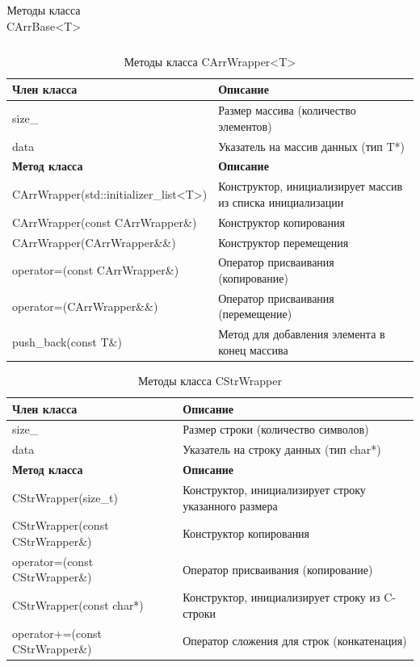 \documentclass[14pt,a4paper]{article}
\begin{document}
{\begin{table}[H]
\begin{tabular}{|l|l|}
  \end{tabular}
  \caption{Методы класса CArrBase<T>}
\end{table}
\begin{table}[H]
  \centering
  \begin{tabular}{|l|l|} \hline
    \textbf{Член класса} & \textbf{Описание} \\ \hline
    size\_ & Размер массива (количество элементов) \\ \hline
    data & Указатель на массив данных (тип T*) \\ \hline
    \textbf{Метод класса} & \textbf{Описание} \\ \hline
    CArrWrapper(std::initializer\_list<T>) & Конструктор, инициализирует массив из списка инициализации \\ \hline
    CArrWrapper(const CArrWrapper\&) & Конструктор копирования \\ \hline
    CArrWrapper(CArrWrapper\&\&) & Конструктор перемещения \\ \hline
    operator=(const CArrWrapper\&) & Оператор присваивания (копирование) \\ \hline
    operator=(CArrWrapper\&\&) & Оператор присваивания (перемещение) \\ \hline
    push\_back(const T\&) & Метод для добавления элемента в конец массива \\ \hline
  \end{tabular}
  \caption{Методы класса CArrWrapper<T>}
\end{table}
\begin{table}[H]
  \centering
  \begin{tabular}{|l|l|} \hline
    \textbf{Член класса} & \textbf{Описание} \\ \hline
    size\_ & Размер строки (количество символов) \\ \hline
    data & Указатель на строку данных (тип char*) \\ \hline
    \textbf{Метод класса} & \textbf{Описание} \\ \hline
    CStrWrapper(size\_t) & Конструктор, инициализирует строку указанного размера \\ \hline
    CStrWrapper(const CStrWrapper\&) & Конструктор копирования \\ \hline
    operator=(const CStrWrapper\&) & Оператор присваивания (копирование) \\ \hline
    CStrWrapper(const char*) & Конструктор, инициализирует строку из C-строки \\ \hline
    operator+=(const CStrWrapper\&) & Оператор сложения для строк (конкатенация) \\ \hline
  \end{tabular}
  \caption{Методы класса CStrWrapper}
\end{table}
}
\end{document}
